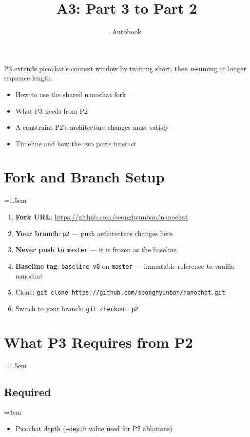 \documentclass[9pt]{extarticle}
\title{\vspace{-1.2cm}\huge\textbf{A3: Part 3 to Part 2}\vspace{-0.5em}}
\author{\normalsize Autobook}
\date{\vspace{-1.5em}}
\begin{document}
\maketitle
\thispagestyle{fancy}

P3 extends picochat's context window by training short, then resuming at longer sequence length.

\begin{itemize}[nosep]
  \item How to use the shared nanochat fork
  \item What P3 needs from P2
  \item A constraint P2's architecture changes must satisfy
  \item Timeline and how the two parts interact
\end{itemize}

\leftskip=0pt
\section*{Fork and Branch Setup}
\leftskip=1.5em

\begin{enumerate}[nosep]
  \item \textbf{Fork URL}: \url{https://github.com/seonghyunban/nanochat}
  \item \textbf{Your branch}: \texttt{p2} --- push architecture changes here
  \item \textbf{Never push to} \texttt{master} --- it is frozen as the baseline
  \item \textbf{Baseline tag}: \texttt{baseline-v0} on \texttt{master} --- immutable reference to vanilla nanochat
  \item Clone: \texttt{git clone https://github.com/seonghyunban/nanochat.git}
  \item Switch to your branch: \texttt{git checkout p2}
\end{enumerate}

\leftskip=0pt
\section*{What P3 Requires from P2}
\leftskip=1.5em

\subsection*{Required}
\leftskip=3em

\begin{itemize}[nosep]
  \item Picochat depth (\texttt{--depth} value used for P2 ablations)
\end{itemize}
\end{document}
